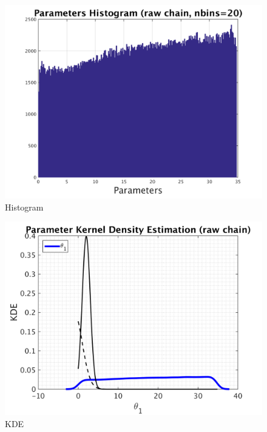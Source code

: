 \begin{figure}[h!]
  
  \centering
   \includegraphics[scale=0.75]{output_50/simple_ip_hist_raw}
   \caption{Histogram}
\end{figure}



\begin{figure}[h!]
  
  \centering
   \includegraphics[scale=0.75]{output_50/simple_ip_kde_raw}
   \caption{ KDE }
\end{figure}

